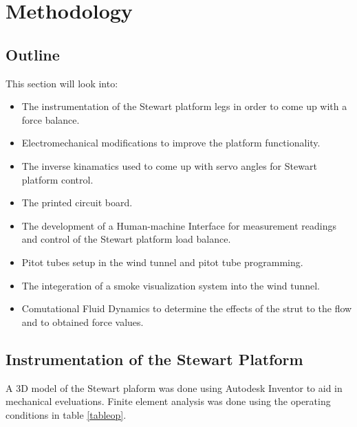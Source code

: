 \section{Methodology}
\subsection{Outline}
This section will look into:
\begin{itemize}
	\item The instrumentation of the Stewart platform legs in order to come up with a force balance.
	\item Electromechanical modifications to improve the platform functionality.
	\item The inverse kinamatics used to come up with servo angles for Stewart platform control.
	\item The printed circuit board.
	\item The development of a Human-machine
	 Interface for measurement readings and control of the Stewart platform load balance.
	\item Pitot tubes setup in the wind tunnel and pitot tube programming.
	\item The integeration of a smoke visualization system into the wind tunnel.
	\item Comutational Fluid Dynamics to determine the effects of the strut to the flow and to obtained 
		force values.
\end{itemize}

\subsection{Instrumentation of the Stewart Platform}
A 3D model of the Stewart plaform was done using Autodesk Inventor to aid in mechanical eveluations.
Finite element analysis was done using the operating conditions in table \ref{tableop}.

